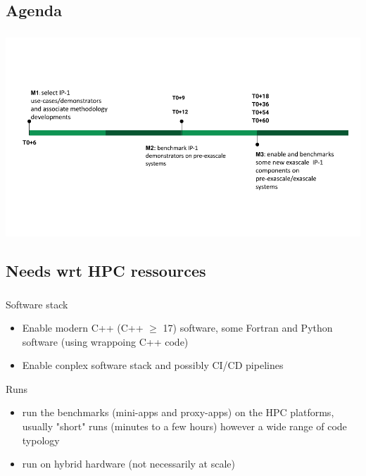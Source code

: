 \subsection{Agenda}
\begin{frame}
  \frametitle{\insertsectionhead}
  \framesubtitle{\insertsubsectionhead}

  \includegraphics[width=\linewidth]{../../figures/exama-timeline.png}
\end{frame}

\subsection{Needs wrt HPC ressources} 
\begin{frame}
  \frametitle{\insertsectionhead}
  \framesubtitle{\insertsubsectionhead}
  
  Software stack
  \begin{itemize}
    \item Enable modern C++ (C++ $\geq$ 17) software, some Fortran and Python software (using wrappoing C++ code)
    \item Enable conplex software stack and possibly CI/CD pipelines
  \end{itemize}

  Runs
  \begin{itemize}
    \item run the benchmarks (mini-apps and proxy-apps) on the HPC platforms, usually "short" runs (minutes to a few hours) however a wide range of code typology
    \item run on hybrid hardware (not necessarily at scale)
  \end{itemize} 


\end{frame}


